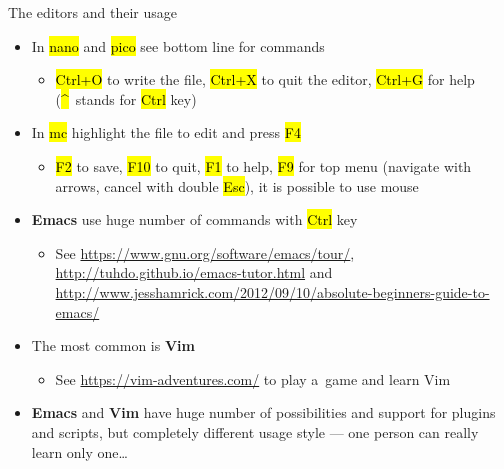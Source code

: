 \documentclass[compress, ucs, xelatex, 11pt, xcolor=svgnames,
  hyperref={
    bookmarks=true,
    unicode=true,
    colorlinks=true,
    pdftitle={Linux, command line and MetaCentrum},
    plainpages=false,
    pdfauthor={Vojtech Zeisek},
    pdfsubject={Course about use of Linux command line, writing shell scripts and using MetaCentrum of CESNET},
    pdfcreator={XeLaTeX},
    pdfkeywords={Linux, GNU, BASH, shell, command line, MetaCentrum},
    linkcolor=DarkRed,
    anchorcolor=DarkBlue,
    citecolor=Indigo,
    filecolor=NavyBlue,
    menucolor=DarkMagenta,
    urlcolor=DarkBlue,
    pdftex},
  url={hyphens, lowtilde} %
  ]{beamer}
\renewcommand{\texttt}[1]{\hl{\ttfamily #1}}
\begin{document}
\begin{frame}{The editors and their usage}
  \begin{itemize}
    \item In \texttt{nano} and \texttt{pico} see bottom line for commands
    \begin{itemize}
      \item \texttt{Ctrl+O} to write the file, \texttt{Ctrl+X} to quit the editor, \texttt{Ctrl+G} for help (\texttt{\textasciicircum}~stands for \texttt{Ctrl} key)
    \end{itemize}
    \item In \texttt{mc} highlight the file to edit and press \texttt{F4}
    \begin{itemize}
      \item \texttt{F2} to save, \texttt{F10} to quit, \texttt{F1} to help, \texttt{F9} for top menu (navigate with arrows, cancel with double \texttt{Esc}), it is possible to use mouse
    \end{itemize}
    \item \textbf{Emacs} use huge number of commands with \texttt{Ctrl} key
    \begin{itemize}
      \item See \url{https://www.gnu.org/software/emacs/tour/}, \url{http://tuhdo.github.io/emacs-tutor.html} and \url{http://www.jesshamrick.com/2012/09/10/absolute-beginners-guide-to-emacs/}
    \end{itemize}
    \item The most common is \textbf{Vim}
    \begin{itemize}
      \item See \url{https://vim-adventures.com/} to play a~game and learn Vim
    \end{itemize}
    \item \textbf{Emacs} and \textbf{Vim} have huge number of possibilities and support for plugins and scripts, but completely different usage style --- one person can really learn only one\ldots
  \end{itemize}
\end{frame}
\end{document}
